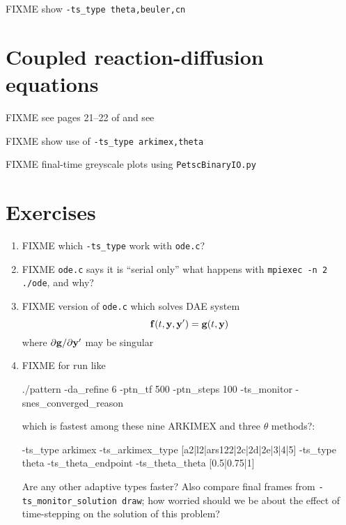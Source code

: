 FIXME show \texttt{-ts\_type theta,beuler,cn}


\section{Coupled reaction-diffusion equations}

FIXME see pages 21--22 of \citep{HundsdorferVerwer2003} and see \citep{Pearson1993}






FIXME show use of \texttt{-ts\_type arkimex,theta}

FIXME final-time greyscale plots using \texttt{PetscBinaryIO.py}


\section{Exercises}

\renewcommand{\labelenumi}{\arabic{chapter}.\arabic{enumi}\quad}
\renewcommand{\labelenumii}{(\alph{enumii})}
\begin{enumerate}
\item FIXME which \texttt{-ts\_type} work with \texttt{ode.c}?
\item FIXME \texttt{ode.c} says it is ``serial only''  what happens with \texttt{mpiexec -n 2 ./ode}, and why?
\item FIXME version of \texttt{ode.c} which solves DAE system
    $$\mathbf{f}(t,\mathbf{y},\mathbf{y}') = \mathbf{g}(t,\mathbf{y})$$
where $\partial \mathbf{g}/\partial \mathbf{y}'$ may be singular
\item FIXME for run like
\begin{cline}
./pattern -da_refine 6 -ptn_tf 500 -ptn_steps 100 -ts_monitor -snes_converged_reason
\end{cline}
which is fastest among these nine ARKIMEX and three $\theta$ methods?:
\begin{code}
-ts_type arkimex -ts_arkimex_type [a2|l2|ars122|2c|2d|2e|3|4|5]
-ts_type theta -ts_theta_endpoint -ts_theta_theta [0.5|0.75|1]
\end{code}
Are any other adaptive \pTS types faster?  Also compare final frames from \texttt{-ts\_monitor\_solution draw}; how worried should we be about the effect of time-stepping on the solution of this problem?
\end{enumerate}
